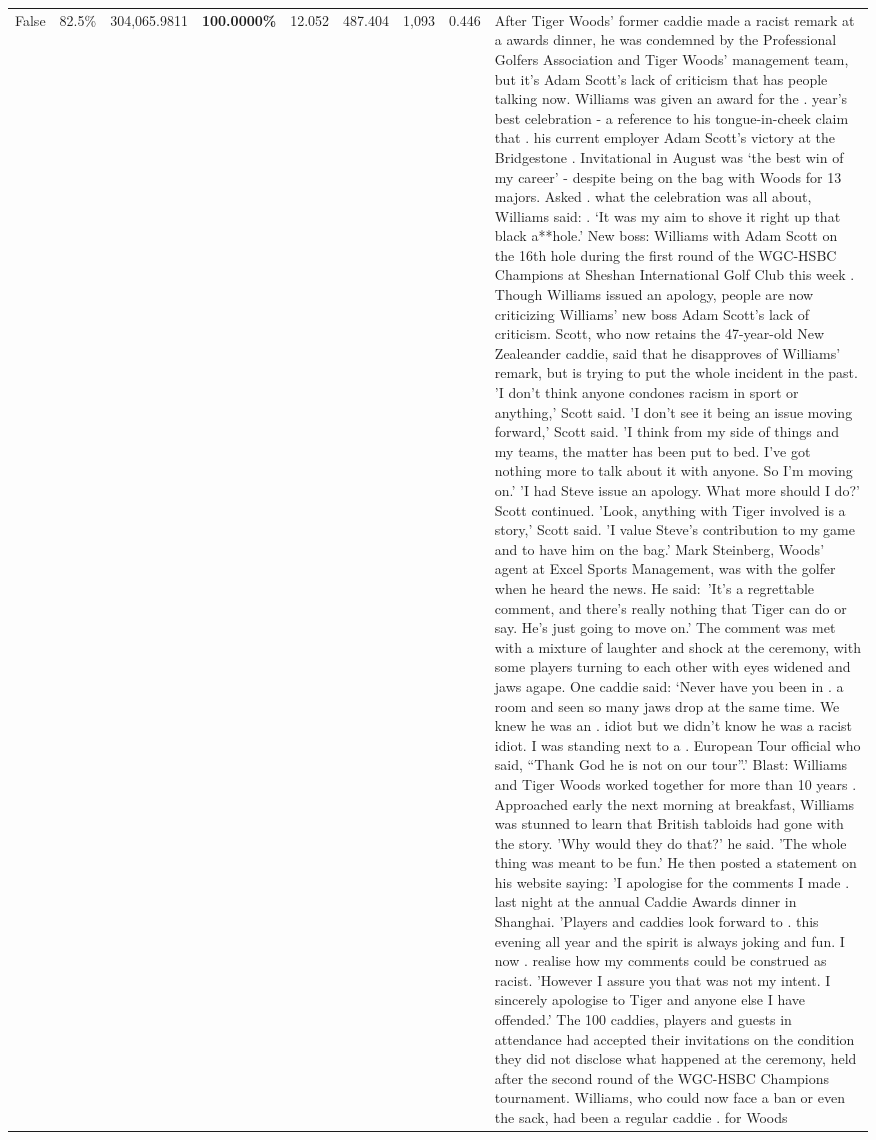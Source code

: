 \begin{table}[H]
\begin{tabular}{lllrlllll}
False & 82.5\% & \color{red} 304,065.9811 & \bfseries \color{red} 100.0000\% & 12.052 & 487.404 & 1,093 & 0.446 & After Tiger Woods' former caddie made a racist remark at a awards dinner, he was condemned by the Professional Golfers Association and Tiger Woods' management team, but it's Adam Scott's lack of criticism that has people talking now. Williams was given an award for the . year’s best celebration - a reference to his tongue-in-cheek claim that . his current employer Adam Scott’s victory at the Bridgestone . Invitational in August was ‘the best win of my career’ - despite being on the bag with Woods for 13 majors. Asked . what the celebration was all about, Williams said: . ‘It was my aim to shove it right up that black a**hole.’ New boss: Williams with Adam Scott  on the 16th hole during the first round of the WGC-HSBC Champions at Sheshan International Golf Club this week . Though Williams issued an apology, people are now criticizing Williams' new boss Adam Scott's lack of criticism. Scott, who now retains the 47-year-old New Zealeander caddie, said that he disapproves of Williams' remark, but is trying to put the whole incident in the past. 'I don't think anyone condones racism in sport or anything,' Scott said. 'I don't see it being an issue moving forward,' Scott said. 'I think from my side of things and my teams, the matter has been put to bed. I've got nothing more to talk about it with anyone. So I'm moving on.' 'I had Steve issue an apology. What more should I do?' Scott continued. 'Look, anything with Tiger involved is a story,' Scott said. 'I value Steve's contribution to my game and to have him on the bag.' Mark Steinberg, Woods' agent at Excel Sports Management, was with the golfer when he heard the news. He said: 'It's a regrettable comment, and there's really nothing that Tiger can do or say. He's just going to move on.' The comment was met with a mixture of laughter and shock at the ceremony, with some players turning to each other with eyes widened and jaws agape. One caddie said: ‘Never have you been in . a room and seen so many jaws drop at the same time. We knew he was an . idiot but we didn’t know he was a racist idiot. I was standing next to a . European Tour official who said, “Thank God he is not on our tour”.’ Blast: Williams and Tiger Woods worked together for more than 10 years . Approached early the next morning at breakfast, Williams was stunned to learn that British tabloids had gone with the story. 'Why would they do that?' he said. 'The whole thing was meant to be fun.' He then posted a statement on his website saying: 'I apologise for the comments I made . last night at the annual Caddie Awards dinner in Shanghai. 'Players and caddies look forward to . this evening all year and the spirit is always joking and fun. I now . realise how my comments could be construed as racist. 'However I assure you that was not my intent. I sincerely apologise to Tiger and anyone else I have offended.' The 100 caddies, players and guests in attendance had accepted their invitations on the condition they did not disclose what happened at the ceremony, held after the second round of the WGC-HSBC Champions tournament. Williams, who could now face a ban or even the sack, had been a regular caddie . for Woods 
\end{tabular}
\end{table}
